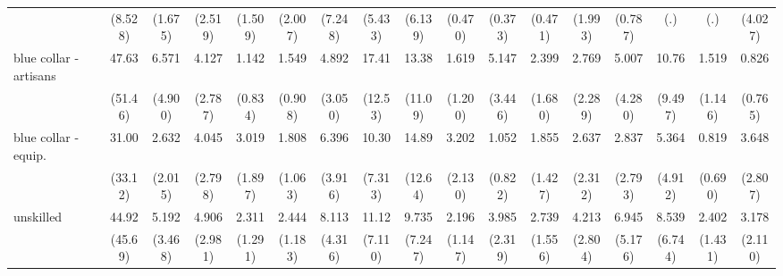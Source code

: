 {\begin{tabular}{l*{16}{c}}
                    &     (8.528)         &     (1.675)         &     (2.519)         &     (1.509)         &     (2.007)         &     (7.248)         &     (5.433)         &     (6.139)         &     (0.470)         &     (0.373)         &     (0.471)         &     (1.993)         &     (0.787)         &         (.)         &         (.)         &     (4.027)         \\
[1em]
blue collar - artisans&       47.63\sym{***}&       6.571\sym{*}  &       4.127\sym{*}  &       1.142         &       1.549         &       4.892\sym{*}  &       17.41\sym{***}&       13.38\sym{**} &       1.619         &       5.147\sym{*}  &       2.399         &       2.769         &       5.007         &       10.76\sym{**} &       1.519         &       0.826         \\
                    &     (51.46)         &     (4.900)         &     (2.787)         &     (0.834)         &     (0.908)         &     (3.050)         &     (12.53)         &     (11.09)         &     (1.200)         &     (3.446)         &     (1.680)         &     (2.289)         &     (4.280)         &     (9.497)         &     (1.146)         &     (0.765)         \\
[1em]
blue collar - equip.&       31.00\sym{**} &       2.632         &       4.045\sym{*}  &       3.019         &       1.808         &       6.396\sym{**} &       10.30\sym{**} &       14.89\sym{**} &       3.202         &       1.052         &       1.855         &       2.637         &       2.837         &       5.364         &       0.819         &       3.648         \\
                    &     (33.12)         &     (2.015)         &     (2.798)         &     (1.897)         &     (1.063)         &     (3.916)         &     (7.313)         &     (12.64)         &     (2.130)         &     (0.822)         &     (1.427)         &     (2.312)         &     (2.793)         &     (4.912)         &     (0.690)         &     (2.807)         \\
[1em]
unskilled           &       44.92\sym{***}&       5.192\sym{*}  &       4.906\sym{**} &       2.311         &       2.444         &       8.113\sym{***}&       11.12\sym{***}&       9.735\sym{**} &       2.196         &       3.985\sym{*}  &       2.739         &       4.213\sym{*}  &       6.945\sym{**} &       8.539\sym{**} &       2.402         &       3.178         \\
                    &     (45.69)         &     (3.468)         &     (2.981)         &     (1.291)         &     (1.183)         &     (4.316)         &     (7.110)         &     (7.247)         &     (1.147)         &     (2.319)         &     (1.556)         &     (2.804)         &     (5.176)         &     (6.744)         &     (1.431)         &     (2.110)         \\

\end{tabular}}
